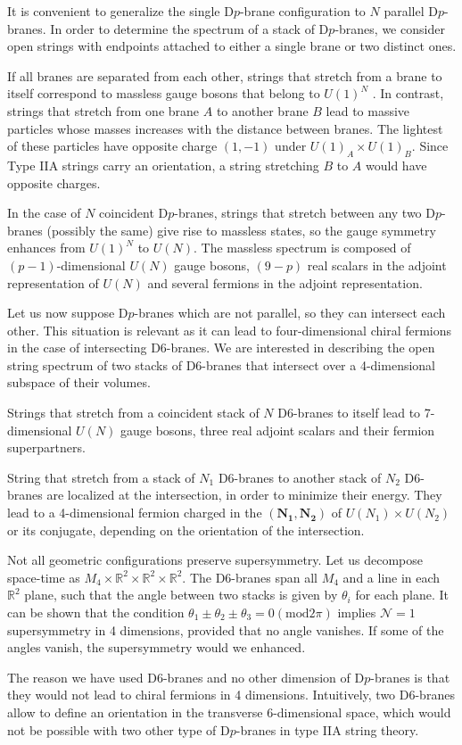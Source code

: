It is convenient to generalize the single D$p$-brane configuration to $N$ parallel D$p$-branes.
In order to determine the spectrum of a stack of D$p$-branes, we consider open strings with endpoints 
attached to either a single brane or two distinct ones.

If all branes are separated from each other, strings that stretch from a brane to itself correspond to massless gauge bosons that belong to $U(1)^N$ .
In contrast, strings that stretch from one brane $A$ to another brane $B$ lead to massive particles whose
masses increases with the distance between branes.
The lightest of these particles have opposite charge $(1,-1)$ under $U(1)_A \times U(1)_B$.
Since Type IIA strings carry an orientation, a string stretching $B$ to $A$ would have opposite charges.

In the case of $N$ coincident D$p$-branes, strings that stretch between any two D$p$-branes (possibly the same)
give rise to massless states, so the gauge symmetry enhances from $U(1)^N$ to $U(N)$.
The massless spectrum is composed of $(p-1)$-dimensional $U(N)$ gauge bosons, $(9-p)$ real
scalars in the adjoint representation of $U(N)$ and several fermions in the adjoint representation.


Let us now suppose D$p$-branes which are not parallel, so they can intersect each other.
This situation is relevant as it can lead to four-dimensional chiral fermions in the case of intersecting D6-branes.
We are interested in describing the open string spectrum of two stacks of D$6$-branes that intersect over a 4-dimensional subspace of their volumes.

Strings that stretch from a coincident stack of $N$ D6-branes to itself lead to 7-dimensional $U(N)$ gauge bosons, three real adjoint scalars and their fermion superpartners.

String that stretch from a stack of $N_1$ D6-branes to another stack of $N_2$ D6-branes are localized at the intersection,
in order to minimize their energy. 
They lead to a 4-dimensional fermion charged in the $(\mathbf{N_1},\mathbf{N_2})$ of $U(N_1)\times U(N_2)$ or its conjugate, depending on the orientation
of the intersection.

Not all geometric configurations preserve supersymmetry. 
Let us decompose space-time as $M_4 \times \mathbb R^2 \times \mathbb R^2 \times \mathbb R^2 $.
The D6-branes span all $M_4$ and a line in each $\mathbb R^2$ plane, such that the angle between
two stacks is given by $\theta_i$ for each plane.
It can be shown that the condition $\theta_1\pm\theta_2\pm\theta_3=0 (\mathrm{mod} 2\pi)$ implies $\mathcal N=1$ 
supersymmetry in 4 dimensions, provided that no angle vanishes.
If some of the angles vanish, the supersymmetry would we enhanced.

The reason we have used D6-branes and no other dimension of D$p$-branes is that they would not lead to chiral fermions in 4 dimensions.
Intuitively, two D6-branes allow to define an orientation in the transverse 6-dimensional space, which would not be possible
with two other type of D$p$-branes in type IIA string theory.
